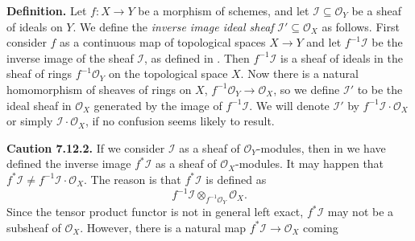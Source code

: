 {\medskip
\noindent\textbf{Definition.} Let $f\colon X\to Y$ be a morphism of schemes, and let $\mathcal I\subseteq\mathcal O_Y$ be a sheaf of ideals on $Y$. We define the \emph{inverse image ideal sheaf} $\mathcal I'\subseteq\mathcal O_X$ as follows. First consider $f$ as a continuous map of topological spaces $X\to Y$ and let $f^{-1}\mathcal I$ be the inverse image of the sheaf $\mathcal I$, as defined in . Then $f^{-1}\mathcal I$ is a sheaf of ideals in the sheaf of rings $f^{-1}\mathcal O_Y$ on the topological space $X$. Now there is a natural homomorphism of sheaves of rings on $X$, $f^{-1}\mathcal O_Y\to\mathcal O_X$, so we define $\mathcal I'$ to be the ideal sheaf in $\mathcal O_X$ generated by the image of $f^{-1}\mathcal I$. We will denote $\mathcal I'$ by $f^{-1}\mathcal I\cdot\mathcal O_X$ or simply $\mathcal I\cdot\mathcal O_X$, if no confusion seems likely to result.

\medskip
\noindent\hypertarget{result-II-7.12.2}{}\textbf{Caution 7.12.2.} If we consider $\mathcal I$ as a sheaf of $\mathcal O_Y$-modules, then in  we have defined the inverse image $f^*\mathcal I$ as a sheaf of $\mathcal O_X$-modules. It may happen that $f^*\mathcal I\ne f^{-1}\mathcal I\cdot\mathcal O_X$. The reason is that $f^*\mathcal I$ is defined as
\[
f^{-1}\mathcal I\otimes_{f^{-1}\mathcal O_Y}\mathcal O_X.
\]
Since the tensor product functor is not in general left exact, $f^*\mathcal I$ may not be a subsheaf of $\mathcal O_X$. However, there is a natural map $f^*\mathcal I\to\mathcal O_X$ coming
}
